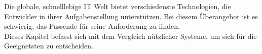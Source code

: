 
Die globale, schnelllebige IT Welt bietet verschiedenste Technologien, die Entwickler in ihrer Aufgabenstellung unterstützen. Bei diesem Überangebot ist es schwierig, das Passende für seine Anforderung zu finden.\\
Dieses Kapitel befasst sich mit dem Vergleich nützlicher Systeme, um sich für die Geeignetsten zu entscheiden.